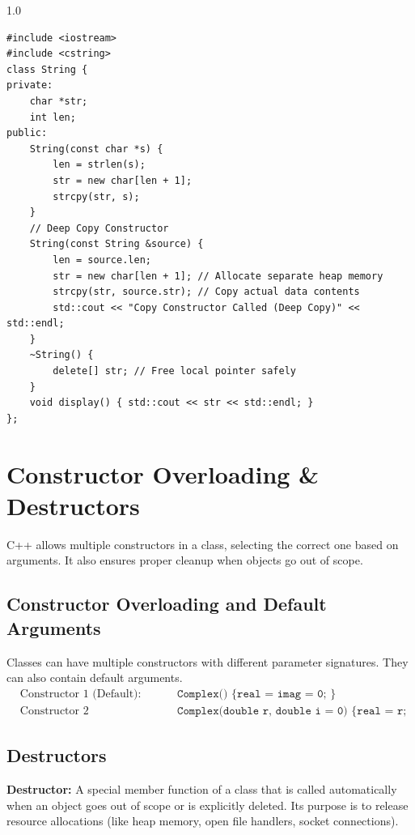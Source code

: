 \documentclass[12pt,a4paper]{article}
\begin{document}
\begin{tcolorbox}[examplebox, title={Code Example: String copy constructor (Deep Copy)}]
\begin{spacing}{1.0}
\begin{verbatim}
#include <iostream>
#include <cstring>
class String {
private:
    char *str;
    int len;
public:
    String(const char *s) {
        len = strlen(s);
        str = new char[len + 1];
        strcpy(str, s);
    }
    // Deep Copy Constructor
    String(const String &source) {
        len = source.len;
        str = new char[len + 1]; // Allocate separate heap memory
        strcpy(str, source.str); // Copy actual data contents
        std::cout << "Copy Constructor Called (Deep Copy)" << std::endl;
    }
    ~String() {
        delete[] str; // Free local pointer safely
    }
    void display() { std::cout << str << std::endl; }
};
\end{verbatim}
\end{spacing}
\end{tcolorbox}

\section{Constructor Overloading \& Destructors}

C++ allows multiple constructors in a class, selecting the correct one based on arguments. It also ensures proper cleanup when objects go out of scope.

\subsection{Constructor Overloading and Default Arguments}
Classes can have multiple constructors with different parameter signatures. They can also contain default arguments.
\begin{align*}
  &\text{Constructor 1 (Default): } && \texttt{Complex() \{ real = imag = 0; \}} \\
  &\text{Constructor 2 (Parameterized): } && \texttt{Complex(double r, double i = 0) \{ real = r; imag = i; \}}
\end{align*}

\subsection{Destructors}
\begin{tcolorbox}[defbox]
\textbf{Destructor:} A special member function of a class that is called automatically when an object goes out of scope or is explicitly deleted. Its purpose is to release resource allocations (like heap memory, open file handlers, socket connections).
\end{tcolorbox}
\end{document}
